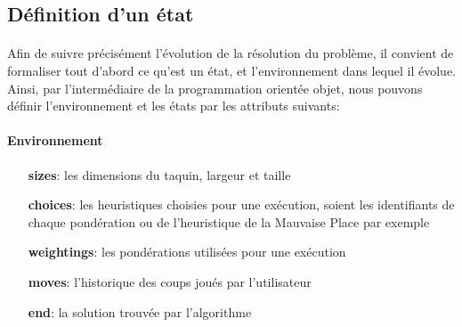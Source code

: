 \documentclass[10pt,a4paper]{report}
\begin{document}
\subsection{Définition d’un état}
\paragraph{}{Afin de suivre précisément l’évolution de la résolution du problème, il convient de formaliser tout d’abord ce qu'est un état, et l'environnement dans lequel il évolue. Ainsi, par l'intermédiaire de la programmation orientée objet, nous pouvons définir l'environnement et les états par les attributs suivants:}
\paragraph{Environnement}
\begin{itemize}
\item [{\ttfamily\bfseries sizes}:] {les dimensions du taquin, largeur et taille}
\item [{\ttfamily\bfseries choices}:] {les heuristiques choisies pour une exécution, soient les identifiants de chaque pondération ou de l'heuristique de la Mauvaise Place par exemple}
\item [{\ttfamily\bfseries weightings}:] {les pondérations utilisées pour une exécution}
\item [{\ttfamily\bfseries moves}:] {l'historique des coups joués par l'utilisateur}
\item [{\ttfamily\bfseries end}:] {la solution trouvée par l'algorithme}
\end{itemize}
\end{document}
